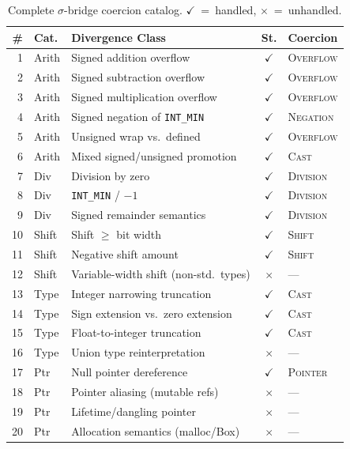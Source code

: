 \documentclass[10pt,a4paper]{article}
\begin{document}
\begin{appendices}
\begin{table}[h!]
\centering
\small
\caption{Complete $\sigma$-bridge coercion catalog.
$\checkmark$~=~handled, $\times$~=~unhandled.}
\label{tab:full-catalog}
\begin{tabular}{@{}rllcl@{}}
\toprule
\# & Cat. & Divergence Class & St. & Coercion \\
\midrule
1  & Arith & Signed addition overflow & $\checkmark$ &
  \textsc{Overflow} \\
2  & Arith & Signed subtraction overflow & $\checkmark$ &
  \textsc{Overflow} \\
3  & Arith & Signed multiplication overflow & $\checkmark$ &
  \textsc{Overflow} \\
4  & Arith & Signed negation of \texttt{INT\_MIN} & $\checkmark$ &
  \textsc{Negation} \\
5  & Arith & Unsigned wrap vs.\ defined & $\checkmark$ &
  \textsc{Overflow} \\
6  & Arith & Mixed signed/unsigned promotion & $\checkmark$ &
  \textsc{Cast} \\
\midrule
7  & Div & Division by zero & $\checkmark$ & \textsc{Division} \\
8  & Div & \texttt{INT\_MIN} / $-1$ & $\checkmark$ &
  \textsc{Division} \\
9  & Div & Signed remainder semantics & $\checkmark$ &
  \textsc{Division} \\
\midrule
10 & Shift & Shift $\geq$ bit width & $\checkmark$ &
  \textsc{Shift} \\
11 & Shift & Negative shift amount & $\checkmark$ &
  \textsc{Shift} \\
12 & Shift & Variable-width shift (non-std.\ types) & $\times$ &
  --- \\
\midrule
13 & Type & Integer narrowing truncation & $\checkmark$ &
  \textsc{Cast} \\
14 & Type & Sign extension vs.\ zero extension & $\checkmark$ &
  \textsc{Cast} \\
15 & Type & Float-to-integer truncation & $\checkmark$ &
  \textsc{Cast} \\
16 & Type & Union type reinterpretation & $\times$ & --- \\
\midrule
17 & Ptr & Null pointer dereference & $\checkmark$ &
  \textsc{Pointer} \\
18 & Ptr & Pointer aliasing (mutable refs) & $\times$ & --- \\
19 & Ptr & Lifetime/dangling pointer & $\times$ & --- \\
20 & Ptr & Allocation semantics (malloc/Box) & $\times$ & --- \\

\end{tabular}
\end{table}
\end{appendices}
\end{document}
